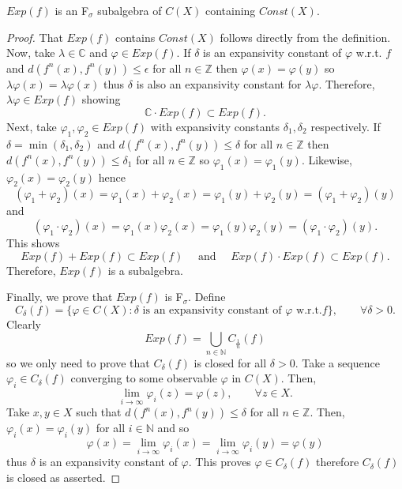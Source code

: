 \documentclass[10pt,a4paper]{amsart}
\begin{document}
\begin{lem}
\label{lobo}
$Exp(f)$ is an F$_\sigma$ subalgebra of $C(X)$ containing $Const(X)$.
\end{lem}

\begin{proof}
That $Exp(f)$ contains $Const(X)$ follows directly from the definition.
Now, take $\lambda\in\mathbb{C}$ and $\varphi\in Exp(f)$.
If $\delta$ is an expansivity constant of $\varphi$ w.r.t. $f$
and $d(f^n(x),f^n(y))\leq\epsilon$ for all $n\in\mathbb{Z}$ then
$\varphi(x)=\varphi(y)$ so $\lambda\varphi(x)=\lambda\varphi(x)$
thus $\delta$ is also an expansivity constant for $\lambda\varphi$.
Therefore, $\lambda\varphi\in Exp(f)$ showing
$$
\mathbb{C}\cdot Exp(f)\subset Exp(f).
$$
Next, take $\varphi_1,\varphi_2\in Exp(f)$ with expansivity constants
$\delta_1,\delta_2$ respectively.
If $\delta=\min(\delta_1,\delta_2)$ and
$d(f^n(x),f^n(y))\leq\delta$ for all $n\in\mathbb{Z}$ then
$d(f^n(x),f^n(y))\leq\delta_1$ for all $n\in\mathbb{Z}$ so
$\varphi_1(x)=\varphi_1(y)$.
Likewise, $\varphi_2(x)=\varphi_2(y)$ hence
$$
(\varphi_1+\varphi_2)(x)=\varphi_1(x)+\varphi_2(x)=\varphi_1(y)+\varphi_2(y)=(\varphi_1+\varphi_2)(y)
$$
and
$$
(\varphi_1\cdot\varphi_2)(x)=\varphi_1(x)\varphi_2(x)=\varphi_1(y)\varphi_2(y)=(\varphi_1\cdot\varphi_2)(y).
$$
This shows
$$
Exp(f)+Exp(f)\subset Exp(f)\quad\mbox{ and }\quad Exp(f)\cdot Exp(f)\subset Exp(f).
$$
Therefore, $Exp(f)$ is a subalgebra.

Finally, we prove that $Exp(f)$ is F$_\sigma$. Define
$$
C_\delta(f)=\{\varphi\in C(X):\delta\mbox{ is an expansivity constant of $\varphi$ w.r.t.}f\},\quad\quad\forall \delta>0.
$$
Clearly
$$
Exp(f)=\bigcup_{n\in\mathbb{N}}C_{\frac{1}n}(f)
$$
so we only need to prove that $C_\delta(f)$ is closed for all $\delta>0$.
Take a sequence $\varphi_i\in C_\delta(f)$ converging to some observable
$\varphi$ in $C(X)$. Then,
$$
\lim_{i\to\infty}\varphi_i(z)=\varphi(z),\quad\quad\forall z\in X.
$$
Take $x,y\in X$ such that
$d(f^n(x),f^n(y))\leq\delta$ for all $n\in\mathbb{Z}$.
Then, $\varphi_i(x)=\varphi_i(y)$ for all $i\in\mathbb{N}$ and so
$$
\varphi(x)=\lim_{i\to\infty}\varphi_i(x)=\lim_{i\to\infty}\varphi_i(y)=\varphi(y)
$$
thus $\delta$ is an expansivity constant of $\varphi$.
This proves $\varphi\in C_\delta(f)$ therefore $C_\delta(f)$ is closed as asserted.
\end{proof}
\end{document}
